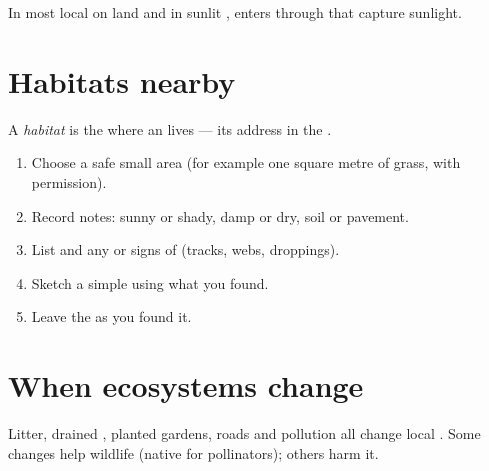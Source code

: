 \begin{proposition}\label{prop:g4:ecosystems:sun}
In most local  on land and in sunlit ,  enters
through  that capture sunlight.
\end{proposition}
\admitted

\section{Habitats nearby}

\begin{definition}[Habitat]\label{def:g4:ecosystems:habitat}
A \emph{habitat} is the  where an  lives ---
its address in the .
\end{definition}



\begin{method}\label{met:g4:ecosystems:survey}
\begin{enumerate}
  \item Choose a safe small area (for example one square metre of
        grass, with permission).
  \item Record  notes: sunny or shady, damp or dry, soil or
        pavement.
  \item List  and any  or signs of  (tracks,
        webs, droppings).
  \item Sketch a simple  using what you found.
  \item Leave the  as you found it.
\end{enumerate}
\end{method}

\section{When ecosystems change}

\begin{example}\label{ex:g4:ecosystems:human}
Litter, drained , planted gardens, roads and pollution all change
local . Some changes help wildlife (native  for
pollinators); others harm it.
\end{example}

